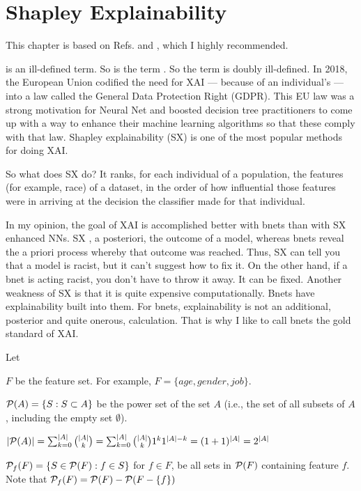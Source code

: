 \chapter{Shapley Explainability}

This chapter
is based on 
Refs.\cite{maz-shap-titanic}
and \cite{maz-shap-income},
which I highly recommended.


\label{ch-shapley}
 is an ill-defined term.
So is the term .
So the term  is doubly ill-defined.
In 2018, the European Union codified 
the need for XAI ---
because of an individual’s  ---
into a law called the General Data Protection 
Right (GDPR). This EU law was a strong 
motivation for Neural Net  
and boosted decision tree practitioners 
to come up with a way to enhance  
their machine learning algorithms
so that these comply with that law. Shapley 
explainability (SX) is 
one of the most popular 
methods for doing XAI.

So what does SX do? It ranks, for each individual 
of a population, the features (for example, race)
of a dataset, in the order of how influential those
features were in arriving at the decision the 
classifier made for that individual.

In my opinion, the goal of XAI is 
accomplished better with
bnets
 than with SX enhanced NNs.
SX , a posteriori, the outcome of a model,
whereas bnets reveal the a priori process whereby 
that outcome was reached. Thus, SX can tell you 
that a model is racist, but it can't suggest 
how to fix it. On the other hand, if a bnet 
is acting racist, you don't have to throw it away. 
It can be fixed. 
Another
weakness of SX is that
it is quite expensive
computationally.
Bnets have explainability
built into them.
For bnets, explainability is
not an additional, posterior and quite
onerous, calculation.
That is why I like to call 
bnets the gold standard of XAI.

Let

$F$ be the feature set. For example,
$F=\{age, gender, job\}$. 

${\cal P}(A)=
\{S: S\subset A \}$ be the power 
set of the set $A$ (i.e., the
set of all subsets of $A$, including
the empty set $\emptyset$).

$|{\cal P}(A)|=\sum_{k=0}^{|A|} {|A|\choose k} =
\sum_{k=0}^{|A|} {|A|\choose k}1^k 1^{|A|-k}
= (1+1)^{|A|}=2^{|A|}$


${\cal P}_f(F)=\{S\in {\cal P}(F): f\in S\}$
for $f\in F$, be all sets in ${\cal P}(F)$
containing feature $f$. Note that 
 ${\cal P}_f(F)= {\cal P}(F)-{\cal P}(F-\{f\})$

